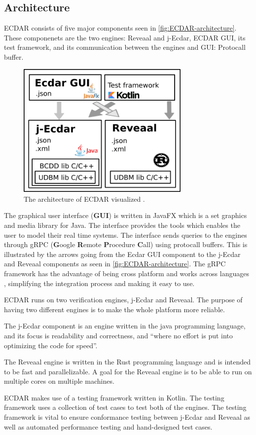 \subsection{Architecture}
ECDAR consists of five major components seen in \autoref{fig:ECDAR-architecture}.
These componenets are the two engines: Reveaal and j-Ecdar, ECDAR GUI, its test framework, and its communication between the engines and GUI: Protocall buffer.
\begin{figure}[H]
    \centering
    \includegraphics[width=0.75\textwidth]{common/figures/ArchOverview.png}
    \caption{The architecture of ECDAR visualized \cite{ECDARNET}.}
    \label{fig:ECDAR-architecture}
\end{figure}
The graphical user interface (\textbf{GUI}) is written in JavaFX which is a set graphics and media library for Java. The interface provides the tools which enables the user to model their real time systems. The interface sends queries to the engines through gRPC (\textbf{G}oogle \textbf{R}emote \textbf{P}rocedure \textbf{C}all) using protocall buffers. This is illustrated by the arrows going from the Ecdar GUI component to the j-Ecdar and Reveaal components as seen in \autoref{fig:ECDAR-architecture}. The gRPC framework has the advantage of being cross platform and works across languages \cite{gRPC}, simplifying the integration process and making it easy to use.

ECDAR runs on two verification engines, j-Ecdar and Reveaal. The purpose of having two different engines is to make the whole platform more reliable.

The j-Ecdar component is an engine written in the java programming language, and its focus is readability and correctness, and ``where no effort is put into optimizing the code for speed''.\cite{ECDARNET}

The Reveaal engine is written in the Rust programming language and is intended to be fast and parallelizable. A goal for the Reveaal engine is to be able to run on multiple cores on multiple machines. 

ECDAR makes use of a testing framework written in Kotlin. 
The testing framework uses a collection of test cases to test both of the engines. 
The testing framework is vital to ensure conformance testing between j-Ecdar and Reveaal as well as automated performance testing and hand-designed test cases. 